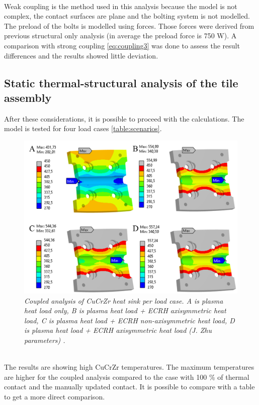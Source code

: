 \\
\normalsize{\indent Weak coupling is the method used in this analysis because the model is not complex, the contact surfaces are plane and the bolting system is not modelled. The preload of the bolts is modelled using forces. Those forces were derived from previous structural only analysis (in average the preload force is 750 \unit{W}). A comparison with strong coupling \ref{eq:coupling3} was done to assess the result differences and the results showed little deviation.}
\subsection{Static thermal-structural analysis of the tile assembly}
\normalsize{After these considerations, it is possible to proceed with the calculations. The model is tested for four load cases \ref{table:scenarios}.}
\\
\begin{figure}[!ht]
    \label{fig_5_22}
    \centering
    \includegraphics[width=1\textwidth]{figures/multiphysicsResults.png}
    \caption{\it Coupled analysis of \acrshort{CuCrZr} heat sink per load case. A is plasma heat load only, B is plasma heat load + ECRH axisymmetric heat load, C is plasma heat load + ECRH non-axisymmetric heat load, D is plasma heat load + ECRH axisymmetric heat load (J. Zhu parameters) \cite{zhu_parametric_2019}.}
\end{figure}
\\
\normalsize{\indent The results are showing high \acrshort{CuCrZr} temperatures. The maximum temperatures are higher for the coupled analysis compared to the case with 100 \% of thermal contact and the manually updated contact. It is possible to compare with a table to get a more direct comparison.}
